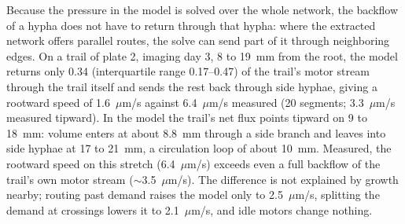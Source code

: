 Because the pressure in the model is solved over the whole network, the backflow of a hypha does not have to return through that hypha: where the extracted network offers parallel routes, the solve can send part of it through neighboring edges.
On a trail of plate 2, imaging day 3, 8 to 19~mm from the root, the model returns only 0.34 (interquartile range 0.17--0.47) of the trail's motor stream through the trail itself and sends the rest back through side hyphae, giving a rootward speed of 1.6~$\mu$m/s against 6.4~$\mu$m/s measured (20 segments; 3.3~$\mu$m/s measured tipward).
In the model the trail's net flux points tipward on 9 to 18~mm: volume enters at about 8.8~mm through a side branch and leaves into side hyphae at 17 to 21~mm, a circulation loop of about 10~mm.
Measured, the rootward speed on this stretch (6.4~$\mu$m/s) exceeds even a full backflow of the trail's own motor stream ($\sim$3.5~$\mu$m/s).
The difference is not explained by growth nearby; routing past demand raises the model only to 2.5~$\mu$m/s, splitting the demand at crossings lowers it to 2.1~$\mu$m/s, and idle motors change nothing.
